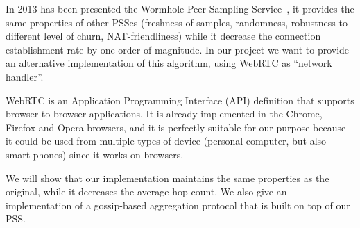In 2013 has been presented the Wormhole Peer Sampling Service~\cite{wormhole}, it provides the same properties of other PSSes (freshness of samples, randomness, robustness to different level of churn, NAT-friendliness) while it decrease the connection establishment rate by one order of magnitude. In our project we want to provide an alternative implementation of this algorithm, using WebRTC as ``network handler''. 

WebRTC is an Application Programming Interface (API) definition that supports browser-to-browser applications. It is already implemented in the Chrome, Firefox and Opera browsers, and it is perfectly suitable for our purpose because it could be used from multiple types of device (personal computer, but also smart-phones) since it works on browsers.

We will show that our implementation maintains the same properties as the original, while it decreases the average hop count. We also give an implementation of a gossip-based aggregation protocol that is built on top of our PSS. 



